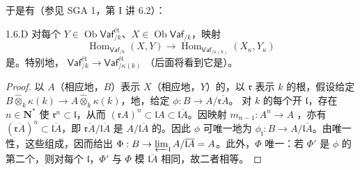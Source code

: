 于是有（参见 SGA 1，第 I 讲 6.2）：
\begin{SGAresult}{}{1.6.D}
对每个 $Y\in\operatorname{Ob}\mathsf{Vaf}^{\text{ét}}_{/k}$、$X\in\operatorname{Ob}\mathsf{Vaf}_{/k}$，映射
\[
 \operatorname{Hom}_{\mathsf{Vaf}_{/k}}(X,Y)\longrightarrow
 \operatorname{Hom}_{\mathsf{Vaf}_{/\kappa(k)}}(X_\kappa,Y_\kappa)
\]
是。特别地， $\mathsf{Vaf}^{\text{ét}}_{/k}\to\mathsf{Vaf}^{\text{ét}}_{/\kappa(k)}$ （后面将看到它是）。
\end{SGAresult}
\begin{proof}
以 $A$（相应地，$B$）表示 $X$（相应地，$Y$）的，以 $\mathfrak r$ 表示 $k$ 的根，假设给定 $B\widehat\otimes_k\kappa(k)\to A\widehat\otimes_k\kappa(k)$，地，给定 $\phi:B\to A/\overline{\mathfrak rA}$。
对 $k$ 的每个开 $\mathfrak l$，存在 $n\in\mathbf N^*$ 使 $\mathfrak r^n\subset\mathfrak l$，从而 $(\mathfrak rA)^n\subset\mathfrak lA\subset\overline{\mathfrak lA}$。因映射 $m_{n-1}:A^n\to A$ ，亦有 $(\overline{\mathfrak rA})^n\subset\overline{\mathfrak lA}$，即 $\overline{\mathfrak rA}/\overline{\mathfrak lA}$ 是 $A/\overline{\mathfrak lA}$ 的。因此 $\phi$ 可唯一地为 $\phi_{\mathfrak l}:B\to A/\overline{\mathfrak lA}$。由唯一性，这些组成，因而给出 $\Phi:B\to\varprojlim_{\mathfrak l}A/\overline{\mathfrak lA}=A$。此外，$\Phi$ 唯一：若 $\Phi'$ 是 $\phi$ 的第二个，则对每个 $\mathfrak l$，$\Phi'$ 与 $\Phi$ 模 $\overline{\mathfrak lA}$ 相同，故二者相等。
\end{proof}
